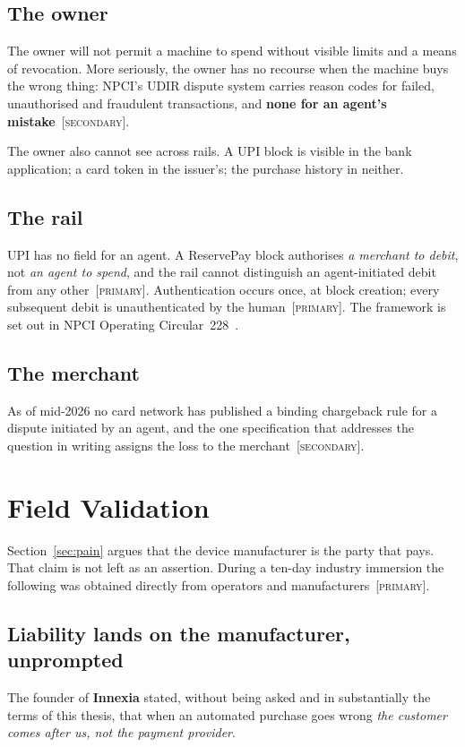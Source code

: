 \documentclass[journal,onecolumn,11pt]{IEEEtran}
\newcommand{\primary}{{\footnotesize\textsc{\textcolor{teal!70!black}{[primary]}}}}
\newcommand{\secondary}{{\footnotesize\textsc{\textcolor{gray!80!black}{[secondary]}}}}
\begin{document}
\subsection{The owner}
The owner will not permit a machine to spend without visible limits and a means of
revocation. More seriously, the owner has no recourse when the machine buys the wrong
thing: NPCI's UDIR dispute system carries reason codes for failed, unauthorised and
fraudulent transactions, and \textbf{none for an agent's mistake}~\secondary.

The owner also cannot see across rails. A UPI block is visible in the bank
application; a card token in the issuer's; the purchase history in neither.

\subsection{The rail}
UPI has no field for an agent. A ReservePay block authorises \emph{a merchant to
debit}, not \emph{an agent to spend}, and the rail cannot distinguish an
agent-initiated debit from any other~\primary. Authentication occurs once, at block
creation; every subsequent debit is unauthenticated by the human~\primary. The
framework is set out in NPCI Operating Circular~228~\cite{npci-228}.

\subsection{The merchant}
As of mid-2026 no card network has published a binding chargeback rule for a dispute
initiated by an agent, and the one specification that addresses the question in writing
assigns the loss to the merchant~\secondary.

\section{Field Validation}\label{sec:field}
Section~\ref{sec:pain} argues that the device manufacturer is the party that pays.
That claim is not left as an assertion. During a ten-day industry immersion the
following was obtained directly from operators and manufacturers~\primary.

\subsection{Liability lands on the manufacturer, unprompted}
The founder of \textbf{Innexia} stated, without being asked and in substantially the
terms of this thesis, that when an automated purchase goes wrong \emph{the customer
comes after us, not the payment provider}.
\end{document}
